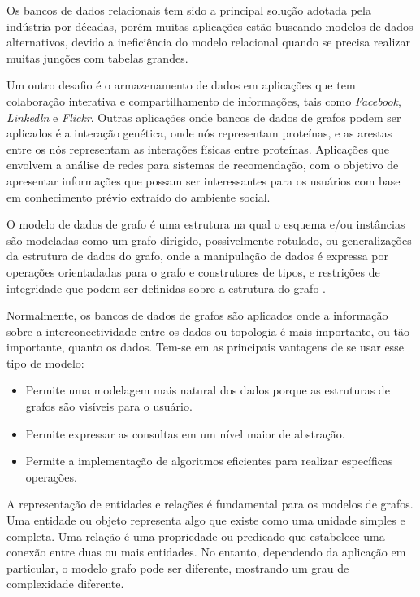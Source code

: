 Os bancos de dados relacionais tem sido a principal solução adotada pela indústria por décadas, porém muitas aplicações estão buscando modelos de dados alternativos, devido a ineficiência do modelo relacional quando se precisa realizar muitas junções com tabelas grandes. 

Um outro desafio é o armazenamento de dados em aplicações que tem colaboração interativa e compartilhamento de informações, tais como \textit{Facebook}, \textit{Linkedln} e \textit{Flickr}. Outras aplicações onde bancos de dados de grafos podem ser aplicados é a interação genética, onde nós representam proteínas, e as arestas entre os nós representam as interações físicas entre proteínas. Aplicações que envolvem a análise de redes para sistemas de recomendação, com o objetivo de apresentar informações que possam ser interessantes para os usuários com base em conhecimento prévio extraído do ambiente social.

O  modelo de dados de grafo é uma estrutura na qual o esquema e/ou instâncias são modeladas como um grafo dirigido, possivelmente rotulado, ou generalizações da estrutura de dados do grafo, onde a manipulação de dados é expressa por operações orientadadas para o grafo e construtores de tipos, e restrições de integridade que podem ser definidas sobre a estrutura do grafo \cite{angels}.

Normalmente, os bancos de dados de grafos são aplicados onde a informação sobre a interconectividade entre os dados ou topologia é mais importante, ou tão importante, quanto os dados. Tem-se em \cite{angels} as principais vantagens de se usar esse tipo de modelo:

\begin{itemize}
\item Permite uma modelagem mais natural dos dados porque as estruturas de grafos são visíveis para o usuário.
\item Permite expressar as consultas em um nível maior de abstração.
\item Permite a implementação de algoritmos eficientes para realizar específicas operações.
\end{itemize}

A representação de entidades e relações é fundamental para os modelos de grafos. Uma entidade ou objeto representa algo que existe como uma unidade simples e completa. Uma relação é uma propriedade ou predicado que estabelece uma conexão entre duas ou mais entidades. No entanto, dependendo da aplicação em particular, o modelo grafo pode ser diferente, mostrando um grau de complexidade diferente.

